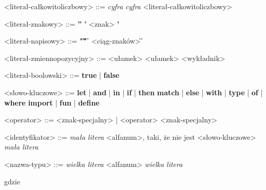 \documentclass[12pt]{article}
\begin{document}
\begin{grammar}

<literał-całkowitoliczbowy> ::=
    \textit{cyfra} 
    \alt \textit{cyfra} <literał-całkowitoliczbowy>

<literał-znakowy> ::=
    \textbf{''}
    \alt \textbf{'} <znak> \textbf{'}

<literał-napisowy> ::=
    \textbf{"\"\""}
    \alt \textbf{\"} <ciąg-znaków> \textbf{\"}

<literał-zmiennopozycyjny> ::=
    <ułamek>
    \alt <ułamek> <wykładnik>

<literał-boolowski> ::=
    \textbf{true}
    | \textbf{false}

<słowo-kluczowe> ::=
    \textbf{let}
    | \textbf{and}
    | \textbf{in}
    | \textbf{if}
    | \textbf{then}
    \alt \textbf{match}
    | \textbf{else}
    | \textbf{with}
    | \textbf{type}
    | \textbf{of}
    | \textbf{where}
    \alt \textbf{import}
    | \textbf{fun}
    | \textbf{define}

<operator> ::= <znak-specjalny> | <operator> <znak-specjalny>

<identyfikator> ::= 
    \textit{mała litera} <alfanum>, taki, że nie jest <słowo-kluczowe>
    \alt \textit{mała litera}

<nazwa-typu> ::=
    \textit{wielka litera} <alfanum>
    \alt \textit{wielka litera}

\end{grammar}

gdzie\\
\end{document}
